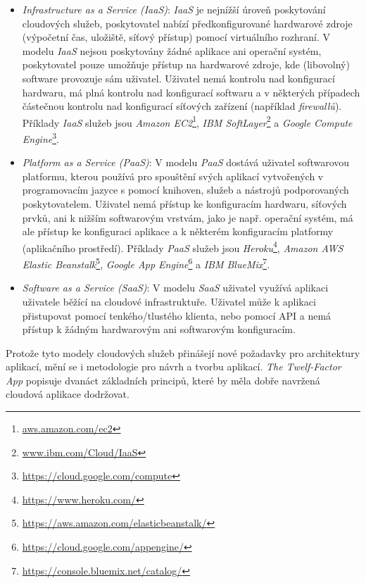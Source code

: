 \begin{itemize}
  \item{\textit{Infrastructure as a Service (IaaS)}}: \textit{IaaS} je nejnížší úroveň poskytování cloudových služeb, poskytovatel nabízí předkonfigurované hardwarové zdroje (výpočetní čas, uložiště, síťový přístup) pomocí virtuálního rozhraní. V modelu \textit{IaaS} nejsou poskytovány žádné aplikace ani operační systém, poskytovatel pouze umožňuje přístup na hardwarové zdroje, kde (libovolný) software provozuje sám uživatel. Uživatel nemá kontrolu nad konfigurací hardwaru, má plná kontrolu nad konfigurací softwaru a v některých případech částečnou kontrolu nad konfigurací síťových zařízení (například \textit{firewallů}). Příklady \textit{IaaS} služeb jsou \textit{Amazon EC2}\footnote{\url{aws.amazon.com/ec2}}, \textit{IBM SoftLayer}\footnote{\url{www.ibm.com/Cloud/IaaS}} a \textit{Google Compute Engine}\footnote{\url{https://cloud.google.com/compute}}.
  \item{\textit{Platform as a Service (PaaS)}}: V modelu \textit{PaaS} dostává uživatel softwarovou platformu, kterou používá pro spouštění svých aplikací vytvořených v programovacím jazyce s pomocí knihoven, služeb a nástrojů podporovaných poskytovatelem. Uživatel nemá přístup ke konfiguracím hardwaru, síťových prvků, ani k nižším softwarovým vrstvám, jako je např. operační systém, má ale přístup ke konfiguraci aplikace a k některém konfiguracím platformy (aplikačního prostředí). Příklady \textit{PaaS} služeb jsou \textit{Heroku}\footnote{\url{https://www.heroku.com/}}, \textit{Amazon AWS Elastic Beanstalk}\footnote{\url{https://aws.amazon.com/elasticbeanstalk/}}, \textit{Google App Engine}\footnote{\url{https://cloud.google.com/appengine/}} a \textit{IBM BlueMix}\footnote{\url{https://console.bluemix.net/catalog/}}.
  \item{\textit{Software as a Service (SaaS)}}: V modelu \textit{SaaS} uživatel využívá aplikaci uživatele běžící na cloudové infrastruktuře. Uživatel může k aplikaci přistupovat pomocí tenkého/tlustého klienta, nebo pomocí API a nemá přístup k žádným hardwarovým ani softwarovým konfiguracím.
\end{itemize}

Protože tyto modely cloudových služeb přinášejí nové požadavky pro architektury aplikací, mění se i metodologie pro návrh a tvorbu aplikací. \textit{The Twelf-Factor App} \cite{Wiggins17} popisuje dvanáct základních principů, které by měla dobře navržená cloudová aplikace dodržovat.

